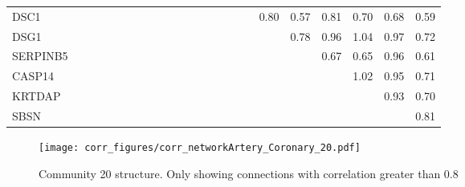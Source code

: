 \begin{longtable}{lrrrrrrrrrrrrrrrrrrrrrr}
DSC1      &               &            &           &           &            &              &              &            &            &            &             &           &            &                 &             &            &       0.80 &           0.57 &         0.81 &         0.70 &       0.68 &          0.59 \\
DSG1      &               &            &           &           &            &              &              &            &            &            &             &           &            &                 &             &            &            &           0.78 &         0.96 &         1.04 &       0.97 &          0.72 \\
SERPINB5  &               &            &           &           &            &              &              &            &            &            &             &           &            &                 &             &            &            &                &         0.67 &         0.65 &       0.96 &          0.61 \\
CASP14    &               &            &           &           &            &              &              &            &            &            &             &           &            &                 &             &            &            &                &              &         1.02 &       0.95 &          0.71 \\
KRTDAP    &               &            &           &           &            &              &              &            &            &            &             &           &            &                 &             &            &            &                &              &              &       0.93 &          0.70 \\
SBSN      &               &            &           &           &            &              &              &            &            &            &             &           &            &                 &             &            &            &                &              &              &            &          0.81 \\
\end{longtable}


\begin{figure}[h!]
\centering
\texttt{[image: corr\_figures/corr\_networkArtery\_Coronary\_20.pdf]}
\caption{Community 20 structure. Only showing connections with correlation greater than 0.8}
\end{figure}




